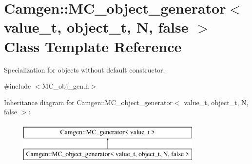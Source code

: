 \hypertarget{a00367}{\section{Camgen\-:\-:M\-C\-\_\-object\-\_\-generator$<$ value\-\_\-t, object\-\_\-t, N, false $>$ Class Template Reference}
\label{a00367}
}


Specialization for objects without default constructor.  




{\ttfamily \#include $<$M\-C\-\_\-obj\-\_\-gen.\-h$>$}

Inheritance diagram for Camgen\-:\-:M\-C\-\_\-object\-\_\-generator$<$ value\-\_\-t, object\-\_\-t, N, false $>$\-:\begin{figure}[H]
\begin{center}
\leavevmode
\includegraphics[height=2.000000cm]{a00367}
\end{center}
\end{figure}
